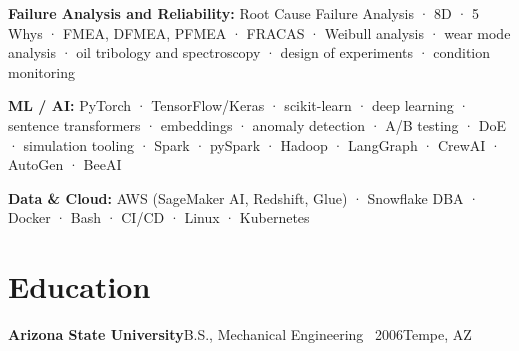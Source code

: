 \documentclass[10pt]{article}
\begin{document}
\textbf{Failure Analysis and Reliability:}  Root Cause Failure Analysis · 8D · 5 Whys · FMEA, DFMEA, PFMEA · FRACAS · Weibull analysis · wear mode analysis · oil tribology and spectroscopy · design of experiments · condition monitoring

\textbf{ML / AI:} PyTorch · TensorFlow/Keras · scikit-learn · deep learning · sentence transformers · embeddings · anomaly detection · A/B testing · DoE · simulation tooling · Spark · pySpark · Hadoop · LangGraph · CrewAI · AutoGen · BeeAI

\par\smallskip

\textbf{Data \& Cloud:} AWS (SageMaker AI, Redshift, Glue) · Snowflake DBA · Docker · Bash · CI/CD · Linux · Kubernetes



\section{Education}
\textbf{Arizona State University}\hspace{0.4em}B.S., Mechanical Engineering \textperiodcentered\ 2006\hfill{\color{slate}\small Tempe, AZ}
\end{document}

